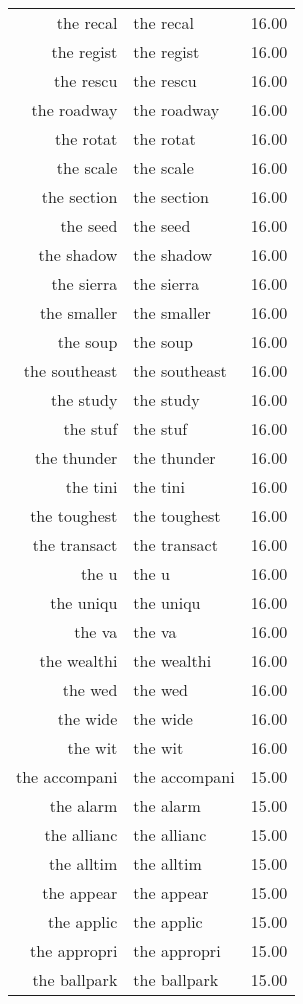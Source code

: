 \begin{table}[ht]
\begin{tabular}{rlr}
  the recal & the recal & 16.00 \\ 
  the regist & the regist & 16.00 \\ 
  the rescu & the rescu & 16.00 \\ 
  the roadway & the roadway & 16.00 \\ 
  the rotat & the rotat & 16.00 \\ 
  the scale & the scale & 16.00 \\ 
  the section & the section & 16.00 \\ 
  the seed & the seed & 16.00 \\ 
  the shadow & the shadow & 16.00 \\ 
  the sierra & the sierra & 16.00 \\ 
  the smaller & the smaller & 16.00 \\ 
  the soup & the soup & 16.00 \\ 
  the southeast & the southeast & 16.00 \\ 
  the study & the study & 16.00 \\ 
  the stuf & the stuf & 16.00 \\ 
  the thunder & the thunder & 16.00 \\ 
  the tini & the tini & 16.00 \\ 
  the toughest & the toughest & 16.00 \\ 
  the transact & the transact & 16.00 \\ 
  the u & the u & 16.00 \\ 
  the uniqu & the uniqu & 16.00 \\ 
  the va & the va & 16.00 \\ 
  the wealthi & the wealthi & 16.00 \\ 
  the wed & the wed & 16.00 \\ 
  the wide & the wide & 16.00 \\ 
  the wit & the wit & 16.00 \\ 
  the accompani & the accompani & 15.00 \\ 
  the alarm & the alarm & 15.00 \\ 
  the allianc & the allianc & 15.00 \\ 
  the alltim & the alltim & 15.00 \\ 
  the appear & the appear & 15.00 \\ 
  the applic & the applic & 15.00 \\ 
  the appropri & the appropri & 15.00 \\ 
  the ballpark & the ballpark & 15.00 \\ 

\end{tabular}
\end{table}

